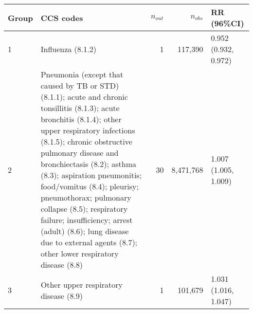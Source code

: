 \begin{tabular}{lp{6.5cm}rrp{2.2cm}}
  \hline
Group & CCS codes & $n_{out}$ & $n_{obs}$ & RR (96\%CI) \\ 
  \hline
   1 & Influenza (8.1.2) &    1 & 117,390 & 0.952 (0.932, 0.972) \\ 
     2 & Pneumonia (except that caused by TB or STD) (8.1.1); acute and chronic tonsillitis (8.1.3); acute bronchitis (8.1.4); other upper respiratory infections (8.1.5); chronic obstructive pulmonary disease and bronchiectasis (8.2); asthma (8.3); aspiration pneumonitis; food/vomitus (8.4); pleurisy; pneumothorax; pulmonary collapse (8.5); respiratory failure; insufficiency; arrest (adult) (8.6); lung disease due to external agents (8.7); other lower respiratory disease (8.8) &   30 & 8,471,768 & 1.007 (1.005, 1.009) \\ 
     3 & Other upper respiratory disease (8.9) &    1 & 101,679 & 1.031 (1.016, 1.047) \\ 
   \hline
\end{tabular}

